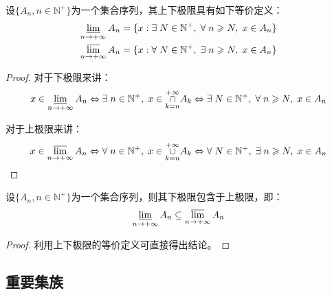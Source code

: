 \begin{theorem}
	设$\{A_n,n\in\mathbb{N}^+\}$为一个集合序列，其上下极限具有如下等价定义：
	\begin{gather*}
		\varliminf_{n\to+\infty}A_n=\{x:\exists\;N\in\mathbb{N}^+,\;\forall\;n\geqslant N,\;x\in A_n\} \\
		\varlimsup_{n\to+\infty}A_n=\{x:\forall\;N\in\mathbb{N}^+,\;\exists\;n\geqslant N,\;x\in A_n\}
	\end{gather*}
\end{theorem}
\begin{proof}
	对于下极限来讲：
	\begin{equation*}
		x\in\varliminf_{n\to+\infty}A_n
		\Leftrightarrow
		\exists\;n\in\mathbb{N}^+,\;x\in\underset{k=n}{\overset{+\infty}{\cap}}A_k
		\Leftrightarrow
		\exists\;N\in\mathbb{N}^+,\;\forall\;n\geqslant N,\;x\in A_n
	\end{equation*}\par
	对于上极限来讲：
	\begin{equation*}
		x\in\varlimsup_{n\to+\infty}A_n
		\Leftrightarrow
		\forall\;n\in\mathbb{N}^+,\;x\in\underset{k=n}{\overset{+\infty}{\cup}}A_k
		\Leftrightarrow
		\forall\;N\in\mathbb{N}^+,\;\exists\;n\geqslant N,\;x\in A_n\qedhere
	\end{equation*}
\end{proof}
\begin{theorem}
	设$\{A_n,n\in\mathbb{N}^+\}$为一个集合序列，则其下极限包含于上极限，即：
	\begin{equation*}
		\varliminf_{n\to+\infty}A_n\subseteq\varlimsup_{n\to+\infty}A_n
	\end{equation*}
\end{theorem}
\begin{proof}
	利用上下极限的等价定义可直接得出结论。
\end{proof}

\subsection{重要集族}
